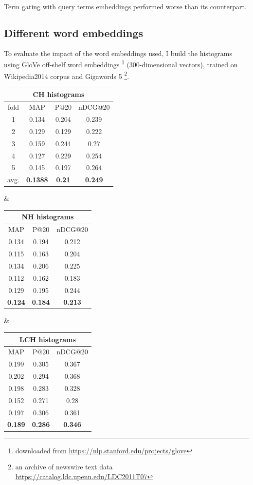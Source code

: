 Term gating with query terms embeddings performed worse than its counterpart.

\subsection{Different word embeddings}

To evaluate the impact of the word embeddings used, I build the histograms using GloVe off-shelf word embeddings \footnote{downloaded from \url{https://nlp.stanford.edu/projects/glove}} (300-dimensional vectors), trained on Wikipedia2014 corpus and Gigawords 5 \footnote{an archive of newswire text data \url{https://catalog.ldc.upenn.edu/LDC2011T07}}.

\begin{adjustbox}{center, tabular=ccc, caption={DRMM runs, 100-100 pos/neg IDF weighting, stemmed with stopwords removal, word embeddings used: GloVe.6B.300D}, nofloat=table}
\centering
\begin{tabular}{c|ccc}
\hline
\multicolumn{4}{c}{CH histograms} \\ \hline
fold & MAP & P@20 & nDCG@20 \\ \hline
1 & 0.134 & 0.204 & 0.239 \\
2 & 0.129 & 0.129 & 0.222 \\
3 & 0.159 & 0.244 & 0.27 \\
4 & 0.127 & 0.229 & 0.254 \\
5 & 0.145 & 0.197 & 0.264 \\ \hline
avg. & \textbf{0.1388} & \textbf{0.21} & \textbf{0.249} \\
\hline
\end{tabular} &
\begin{tabular}{ccc}
\hline
\multicolumn{3}{c}{NH histograms} \\ \hline
MAP & P@20 & nDCG@20 \\ \hline
0.134 & 0.194 & 0.212 \\
0.115 & 0.163 & 0.204 \\
0.134 & 0.206 & 0.225 \\
0.112 & 0.162 & 0.183 \\
0.129 & 0.195 & 0.244 \\ \hline
\textbf{0.124} & \textbf{0.184} & \textbf{0.213} \\
\hline
\end{tabular} &
\begin{tabular}{ccc}
\hline
\multicolumn{3}{c}{LCH histograms} \\ \hline
MAP & P@20 & nDCG@20 \\ \hline
0.199 & 0.305 & 0.367 \\
0.202 & 0.294 & 0.368 \\
0.198 & 0.283 & 0.328 \\
0.152 & 0.271 & 0.28 \\
0.197 & 0.306 & 0.361 \\ \hline
\textbf{0.189} & \textbf{0.286} & \textbf{0.346} \\
\hline
\end{tabular}
\label{tab:gloveres}
\end{adjustbox}

